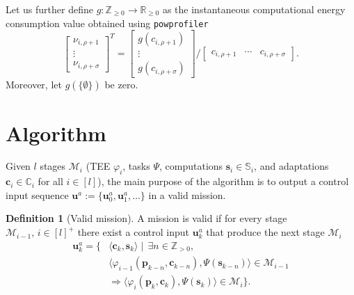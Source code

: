 \documentclass[letterpaper,10pt,conference]{ieeeconf}
\newcommand{\stt}[1]{{\small\tt #1}} %
\newcommand{\powprof}{\stt{powprofiler}}
\theoremstyle{definition}
\newtheorem{defn}{Definition}[section]
\begin{document}
Let us further define $g:\mathbb{Z}_{\geq 0}\rightarrow\mathbb{R}_{\geq 0}$ as the instantaneous computational energy consumption value obtained using \powprof{}
\begin{equation}\label{eq:energy-comp}
  \begin{bmatrix}\nu_{i,\rho+1} \\ \vdots \\ \nu_{i,\rho+\sigma}\end{bmatrix}^T=\begin{bmatrix}g(c_{i,\rho+1}) \\ \vdots \\ g(c_{i,\rho+\sigma})\end{bmatrix}/\begin{bmatrix}c_{i,\rho+1} & \cdots & c_{i,\rho+\sigma}\end{bmatrix}.
\end{equation}
Moreover, let $g(\{\emptyset\})$ be zero.

\leavevmode\thispagestyle{empty}\newpage

\section{Algorithm}
\label{sec:algo}

Given $l$ stages $\mathcal{M}_i$ (TEE $\varphi_i$, tasks $\Psi$, computations $\mathbf{s}_i\in\mathbb{S}_i$, and adaptations $\mathbf{c}_i\in\mathbb{C}_i$ for all $i\in[l]$), the main purpose of the algorithm is to output a control input sequence $\mathbf{u}^a:=\{\mathbf{u}_0^a,\mathbf{u}_1^a,\dots\}$ in a valid mission.

\begin{defn}[Valid mission]\label{def:valid}
  A mission is valid if for every stage $\mathcal{M}_{i-1},\,i\in[l]^+$ there exist a control input $\mathbf{u}_k^{a}$ that produce the next stage $\mathcal{M}_i$
  \begin{equation}\begin{split}\label{eq:mission-valid}
    \mathbf{u}^a_{k}=\{&\langle\mathbf{c}_{k},\mathbf{s}_{k}\rangle\mid\,\exists n\in\mathbb{Z}_{>0},\\&\langle\varphi_{i-1}(\mathbf{p}_{k-n},\mathbf{c}_{k-n}),\Psi(\mathbf{s}_{k-n})\rangle\in\mathcal{M}_{i-1}\\
    &\Longrightarrow\langle\varphi_i(\mathbf{p}_{k},\mathbf{c}_{k}),\Psi(\mathbf{s}_{k})\rangle\in\mathcal{M}_{i}\}.
  \end{split}\end{equation}
\end{defn}
\end{document}
